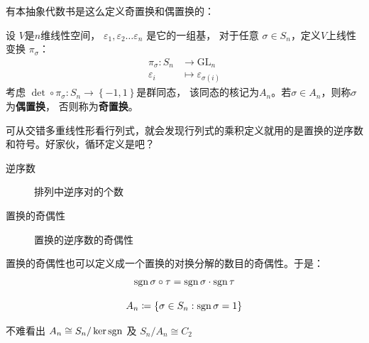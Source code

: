 有本抽象代数书是这么定义奇置换和偶置换的：
\begin{definition}
    设 \(V\)是\(n\)维线性空间，
    \(\varepsilon_{1},\varepsilon_{2}\dots \varepsilon_{n}\) 是它的一组基，
    对于任意 \(\sigma \in S_{n}\)，定义\(V\)上线性变换 \(\pi_{\sigma}\)：
    \begin{align*}
        \pi_{\sigma}: S_{n} & \to \mathrm{GL}_{n} \\
        \varepsilon_{i} & \mapsto \varepsilon_{\sigma(i)}
    \end{align*}
    考虑 \(\det\circ\pi_{\sigma}: S_{n}\to \left\{ -1,1 \right\}\)是群同态，
    该同态的核记为\(A_{n}\)。若\(\sigma\in A_{n}\)，则称\(\sigma\)为\textbf{偶置换}，
    否则称为\textbf{奇置换}。
\end{definition}
可从交错多重线性形看行列式，就会发现行列式的乘积定义就用的是置换的逆序数和符号。好家伙，循环定义是吧？

\begin{description}
    \item[逆序数] 排列中逆序对的个数
    \item[置换的奇偶性] 置换的逆序数的奇偶性
\end{description}
置换的奇偶性也可以定义成一个置换的对换分解的数目的奇偶性。于是：
\begin{align*}
    \operatorname{sgn} \sigma\circ\tau = \operatorname{sgn} \sigma \cdot \operatorname{sgn} \tau
\end{align*}

\begin{definition}[交错群]
    \[
        A_{n}\coloneqq \left\{ \sigma\in S_{n}:\operatorname{sgn}\sigma=1 \right\}
    \]
\end{definition}
不难看出 \(A_{n}\cong S_{n}/ \ker \operatorname{sgn}\) 及 \(S_{n} / A_{n} \cong C_{2}\)
